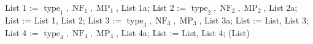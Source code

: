 \documentclass[noend]{amsproc}
\theoremstyle{definition}
\DeclareMathOperator{\MP}{MP}
\DeclareMathOperator{\type}{type}
\DeclareMathOperator{\jet}{jet}
\DeclareMathOperator{\NF}{NF}
\DeclareMathOperator{\Q}{\mathbb{Q}}
\begin{document}
\begin{algorithm}[ht]
\begin{algorithmic}[1]
\State List 1 := $\type_1,\NF_1, \MP_1$, List 1a; 
\State List 2 := $\type_2,\NF_2, \MP_2$, List 2a; 
\State List := List 1, List 2;
\State List 3 := $\type_3,\NF_3, \MP_3$, List 3a; 
\State List := List, List 3;
\EndIf
{}
\State List 4 := $\type_4,\NF_4, \MP_4$, List 4a; 
\State List := List, List 4;
\EndIf
\Return (List)
\Else


\end{algorithmic}
\end{algorithm}
\end{document}

